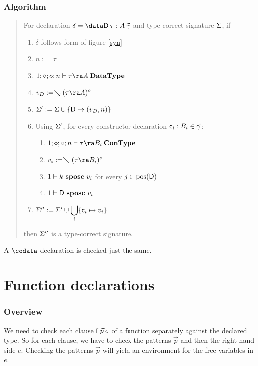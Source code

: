 \subsubsection{Algorithm}
\begin{quote}
For declaration $\delta = \data \DD \: \tau : A \: \vec{\gamma}$ and type-correct signature $\Sigma$, if 
\begin{enumerate}
\item 
$\delta$ follows form of figure \ref{syn}
\item
$ n := \vert\tau\vert $
\item
$\DataType{1}{\diamond}{\diamond}{n}{ \tau \ra A}$ 
\item
$v_D := \wh \clp{\tau \ra A}{\diamond}$
\item
$\Sigma' := \Sigma \cup \{\mathsf{D} \mapsto (v_D,n)\}$
\item
Using $\Sigma'$, for every constructor declaration $\mathsf{c}_i : B_i  \in \vec{\gamma}$:
\begin{enumerate} 
\item
$\ConType{1}{\diamond}{\diamond}{n}{\tau \ra B_i}$ 
\item
$v_i := \wh \clp{\tau \ra B_i}{\diamond}$
\item
$1\vdash k\mbox{ \textbf{sposc} }v_i$ for every $j \in \mbox{pos}(\mathsf{D}) $ 
\item
$1\vdash\mathsf{D}\mbox{ \textbf{sposc} }v_i$ 
\end{enumerate}
\item
$\Sigma'' := \Sigma' \cup \displaystyle\bigcup_{i} \{\mathsf{c}_i \mapsto v_i\}$
\end{enumerate}
then $\Sigma''$ is a type-correct signature.
\end{quote}
A $\codata$ declaration is checked just the same.


\section{Function declarations}

\newcommand\checkcl[2]{#1\:\mathbf{checkcl}\:#2}
\newcommand\checkp[5]{(#1)\vdash#2\:\mathbf{chkP}\:#3\Rightarrow (#4),#5}
\newcommand\checkps[5]{(#1)\vdash#2\:\mathbf{chkPs}\:#3\Rightarrow (#4),#5}
\newcommand\checkinacc[4]{(#1)\vdash#2\:\mathbf{checkinacc}\:#3 : #4}
\newcommand\unify[5]{#1,#2\vdash#3\:\mathbf{inst}\:#4\Rightarrow #5}
\newcommand\unifylist[5]{#1,#2\vdash#3\:\mathbf{inst_{list}}\:#4\Rightarrow #5}


\subsubsection{Overview}
We need to check each clause $\mathsf{f} \: \vec{p} \: e$ of a function separately against the declared type.
So for each clause, we have to check the patterns $\vec{p}$ and then the right hand side $e$.
Checking the patterns $\vec{p}$ will yield an environment for the free variables in $e$.

